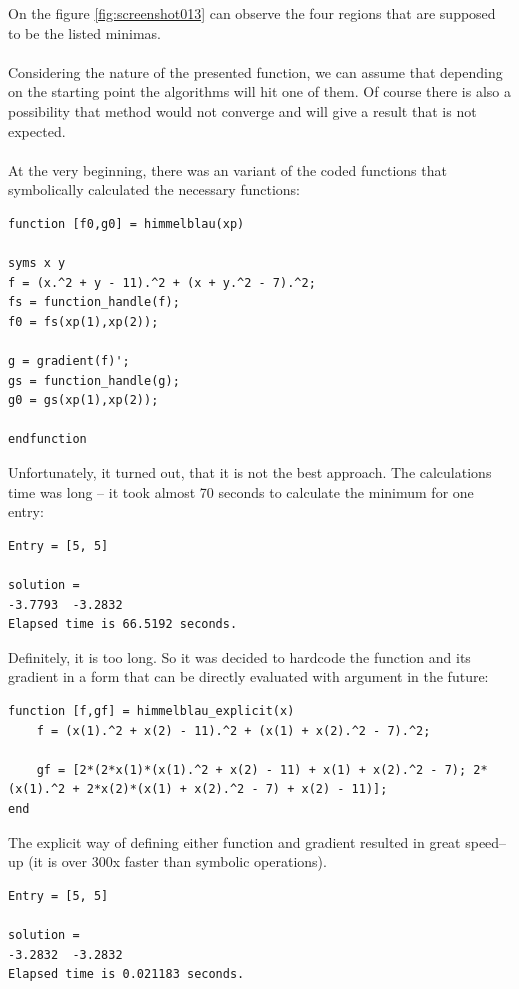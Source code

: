 \documentclass[eng,openany]{mgr}
\begin{document}
On the figure \ref{fig:screenshot013} can observe the four regions that are supposed to be the listed minimas.\\ \\
Considering the nature of the presented function, we can assume that depending on the starting point the algorithms will hit one of them. Of course there is also a possibility that method would not converge and will give a result that is not expected.
\\
\\
At the very beginning, there was an variant of the coded functions that symbolically calculated the necessary functions:
\begin{lstlisting}
function [f0,g0] = himmelblau(xp)

syms x y
f = (x.^2 + y - 11).^2 + (x + y.^2 - 7).^2;
fs = function_handle(f);
f0 = fs(xp(1),xp(2));

g = gradient(f)';
gs = function_handle(g);
g0 = gs(xp(1),xp(2));

endfunction
\end{lstlisting}
Unfortunately, it turned out, that it is not the best approach. The calculations time was long -- it took almost 70 seconds to calculate the minimum for one entry:
\begin{lstlisting}
Entry = [5, 5]

solution = 
-3.7793  -3.2832
Elapsed time is 66.5192 seconds.
\end{lstlisting}
Definitely, it is too long. So it was decided to hardcode the function and its gradient in a form that can be directly evaluated with argument in the future:
\begin{lstlisting}
function [f,gf] = himmelblau_explicit(x)
	f = (x(1).^2 + x(2) - 11).^2 + (x(1) + x(2).^2 - 7).^2;
	
	gf = [2*(2*x(1)*(x(1).^2 + x(2) - 11) + x(1) + x(2).^2 - 7); 2*(x(1).^2 + 2*x(2)*(x(1) + x(2).^2 - 7) + x(2) - 11)];
end
\end{lstlisting}

The explicit way of defining either function and gradient resulted in great speed--up (it is over 300x faster than symbolic operations). \begin{lstlisting}
Entry = [5, 5]

solution =
-3.2832  -3.2832
Elapsed time is 0.021183 seconds.
\end{lstlisting}
\end{document}
